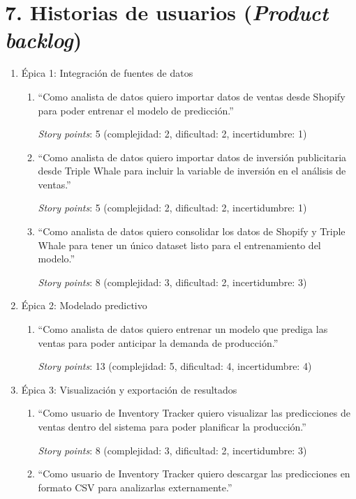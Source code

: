 \documentclass[
11pt, %
]{charter}
\begin{document}
\section{7. Historias de usuarios (\textit{Product backlog})}
\label{sec:backlog}
\begin{enumerate}
	\item Épica 1: Integración de fuentes de datos
	\begin{enumerate}
		\item “Como analista de datos quiero importar datos de ventas desde Shopify para poder entrenar el modelo de predicción.”

		\textit{Story points}: 5 (complejidad: 2, dificultad: 2, incertidumbre: 1)

		\item “Como analista de datos quiero importar datos de inversión publicitaria desde Triple Whale para incluir la variable de inversión en el análisis de ventas.”

		\textit{Story points}: 5 (complejidad: 2, dificultad: 2, incertidumbre: 1)

		\item “Como analista de datos quiero consolidar los datos de Shopify y Triple Whale para tener un único dataset listo para el entrenamiento del modelo.”

		\textit{Story points}: 8 (complejidad: 3, dificultad: 2, incertidumbre: 3)
	\end{enumerate}
	\item Épica 2: Modelado predictivo
	\begin{enumerate}
		\item “Como analista de datos quiero entrenar un modelo que prediga las ventas para poder anticipar la demanda de producción.”

		\textit{Story points}: 13 (complejidad: 5, dificultad: 4, incertidumbre: 4)
	\end{enumerate}
	\item Épica 3: Visualización y exportación de resultados
	\begin{enumerate}
		\item “Como usuario de Inventory Tracker quiero visualizar las predicciones de ventas dentro del sistema para poder planificar la producción.”

		\textit{Story points}: 8 (complejidad: 3, dificultad: 2, incertidumbre: 3)

		\item “Como usuario de Inventory Tracker quiero descargar las predicciones en formato CSV para analizarlas externamente.”


\end{enumerate}
\end{enumerate}
\end{document}
